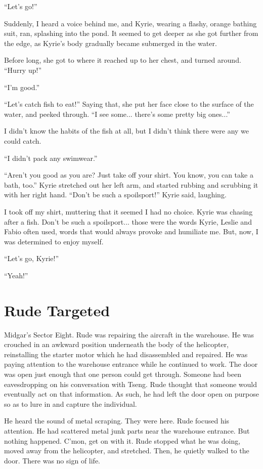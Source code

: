 \documentclass[oneside]{book}
\begin{document}
“Let’s go!”

Suddenly, I heard a voice behind me, and Kyrie, wearing a flashy, orange bathing suit, ran, splashing into the pond. It seemed to get deeper as she got further from the edge, as Kyrie’s body gradually became submerged in the water.

Before long, she got to where it reached up to her chest, and turned around. “Hurry up!”

“I’m good.”

“Let’s catch fish to eat!” Saying that, she put her face close to the surface of the water, and peeked through. “I see some... there’s some pretty big ones...”

I didn’t know the habits of the fish at all, but I didn’t think there were any we could catch.

“I didn’t pack any swimwear.”

“Aren’t you good as you are? Just take off your shirt. You know, you can take a bath, too.” Kyrie stretched out her left arm, and started rubbing and scrubbing it with her right hand. “Don’t be such a spoilsport!” Kyrie said, laughing.

I took off my shirt, muttering that it seemed I had no choice. Kyrie was chasing after a fish. Don’t be such a spoilsport... those were the words Kyrie, Leslie and Fabio often used, words that would always provoke and humiliate me. But, now, I was determined to enjoy myself.

“Let’s go, Kyrie!”

“Yeah!”

\chapter{Rude Targeted}
Midgar’s Sector Eight. Rude was repairing the aircraft in the warehouse. He was crouched in an awkward position underneath the body of the helicopter, reinstalling the starter motor which he had disassembled and repaired. He was paying attention to the warehouse entrance while he continued to work. The door was open just enough that one person could get through. Someone had been eavesdropping on his conversation with Tseng. Rude thought that someone would eventually act on that information. As such, he had left the door open on purpose so as to lure in and capture the individual.

He heard the sound of metal scraping. They were here. Rude focused his attention. He had scattered metal junk parts near the warehouse entrance. But nothing happened. C’mon, get on with it. Rude stopped what he was doing, moved away from the helicopter, and stretched. Then, he quietly walked to the door. There was no sign of life.
\end{document}
